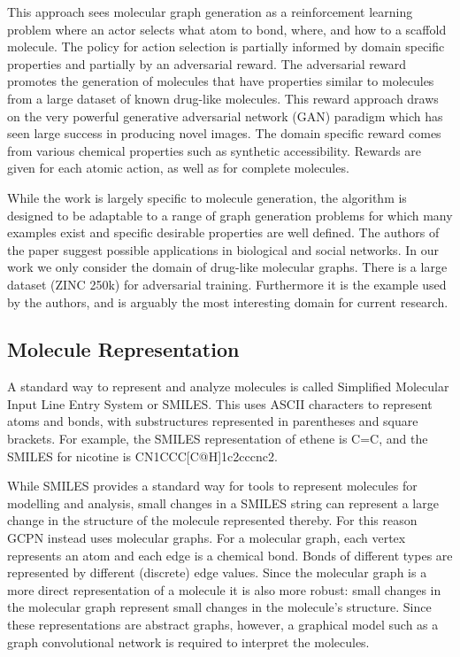 \documentclass{article}
\begin{document}
This approach sees molecular graph generation as a reinforcement learning problem where an actor selects what atom to bond, where, and how to a scaffold molecule. The policy for action selection is partially informed by domain specific properties and partially by an adversarial reward. The adversarial reward promotes the generation of molecules that have properties similar to molecules from a large dataset of known drug-like molecules. This reward approach draws on the very powerful generative adversarial network (GAN) paradigm which has seen large success in producing novel images. The domain specific reward comes from various chemical properties such as synthetic accessibility. Rewards are given for each atomic action, as well as for complete molecules.

While the work is largely specific to molecule generation, the algorithm is designed to be adaptable to a range of graph generation problems for which many examples exist and specific desirable properties are well defined. The authors of the paper suggest possible applications in biological and social networks.
In our work we only consider the domain of drug-like molecular graphs. There is a large dataset (ZINC 250k) for adversarial training. Furthermore it is the example used by the authors, and is arguably the most interesting domain for current research.
\subsection{Molecule Representation}
A standard way to represent and analyze molecules is called Simplified Molecular Input Line Entry System or SMILES. This uses ASCII characters to represent atoms and bonds, with substructures represented in parentheses and square brackets. For example, the SMILES representation of ethene is C=C, and the SMILES for nicotine is CN1CCC[C@H]1c2cccnc2.

While SMILES provides a standard way for tools to represent molecules for modelling and analysis, small changes in a SMILES string can represent a large change in the structure of the molecule represented thereby. For this reason GCPN instead uses molecular graphs. For a molecular graph, each vertex represents an atom and each edge is a chemical bond. Bonds of different types are represented by different (discrete) edge values. Since the molecular graph is a more direct representation of a molecule it is also more robust: small changes in the molecular graph represent small changes in the molecule's structure. Since these representations are abstract graphs, however, a graphical model such as a graph convolutional network is required to interpret the molecules.
\end{document}
